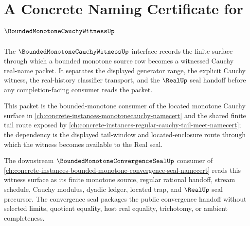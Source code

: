 \chapter{A Concrete Naming Certificate for $\BoundedMonotoneCauchyWitnessUp$}
\label{ch:concrete-instances-boundedmonotonecauchywitness-namecert}

The $\BoundedMonotoneCauchyWitnessUp$ interface records the finite surface through which a bounded monotone source row becomes a witnessed Cauchy real-name packet. It separates the displayed generator range, the explicit Cauchy witness, the real-history classifier transport, and the $\RealUp$ seal handoff before any completion-facing consumer reads the packet.

This packet is the bounded-monotone consumer of the located monotone Cauchy surface in \autoref{ch:concrete-instances-monotonecauchy-namecert} and the shared finite tail route exposed by \autoref{ch:concrete-instances-regular-cauchy-tail-meet-namecert}; the dependency is the displayed tail-window and located-enclosure route through which the witness becomes available to the Real seal.

The downstream $\BoundedMonotoneConvergenceSealUp$ consumer of \autoref{ch:concrete-instances-bounded-monotone-convergence-seal-namecert} reads this witness surface as its finite monotone source, regular rational handoff, stream schedule, Cauchy modulus, dyadic ledger, located trap, and $\RealUp$ seal precursor. The convergence seal packages the public convergence handoff without selected limits, quotient equality, host real equality, trichotomy, or ambient completeness.

